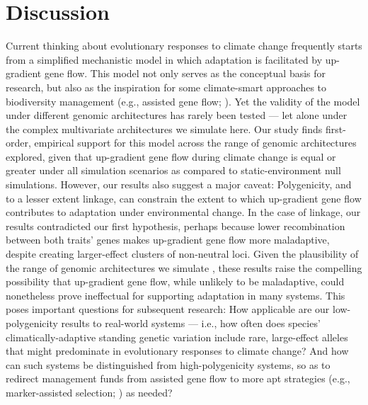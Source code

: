 \documentclass[9pt,twocolumn,twoside,lineno]{pnas-new}
\begin{document}
\section*{Discussion}

Current thinking about evolutionary responses to climate change
frequently starts from a simplified mechanistic model in which
adaptation is facilitated by up-gradient gene flow.
This model not only serves as the conceptual basis for research,
but also as the inspiration for some climate-smart
approaches to biodiversity management
(e.g., assisted gene flow; \cite{aitken_whitlock}).
Yet the validity of the model under different
genomic architectures has rarely been tested --- let
alone under the complex multivariate architectures we simulate here.
Our study finds first-order, empirical support for this
model across the range of genomic architectures explored,
given that up-gradient gene flow during climate change
is equal or greater under all simulation scenarios
as compared to static-environment null simulations.
However, our results also suggest a major caveat:
Polygenicity, and to a lesser extent linkage,
can constrain the extent to which up-gradient
gene flow contributes to adaptation under environmental change.
In the case of linkage, our results contradicted our first hypothesis,
perhaps because lower recombination between both traits'
genes makes up-gradient gene flow more maladaptive,
despite creating larger-effect clusters of non-neutral loci.
Given the plausibility of the range of genomic architectures we simulate
\cite{barghi_polygenic,boyle,rockman,savolainen,sella,bomblies},
these results raise the compelling
possibility that up-gradient gene flow, while unlikely
to be maladaptive, could nonetheless prove
ineffectual for supporting adaptation in many systems.
This poses important questions for subsequent research:
How applicable are our low-polygenicity results to real-world
systems --- i.e., how often does species' climatically-adaptive
standing genetic variation include
rare, large-effect alleles that might predominate in
evolutionary responses to climate change?
And how can such systems be distinguished from high-polygenicity systems,
so as to redirect management funds from assisted gene flow
to more apt strategies (e.g., marker-assisted selection; \cite{muranty}) as needed?
\end{document}
